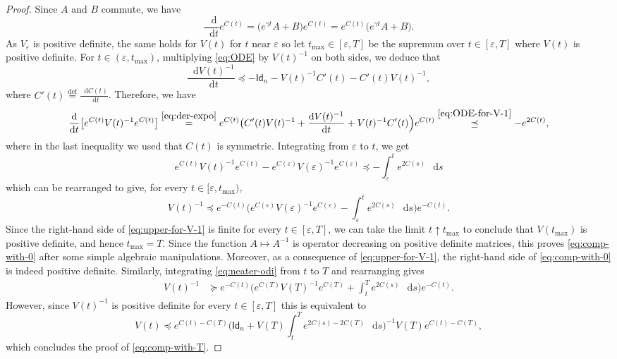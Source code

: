 \documentclass[a4paper,twoside,11pt,reqno]{amsart}
\newcommand{\eqdef}{\stackrel{\mathrm{def}}{=}}
\newcommand*\diff{\mathop{}\!\mathrm{d}}
\newcommand{\e}{\varepsilon}
\newcommand{\msf}{\mathsf}
\begin{document}
\begin{proof}
Since $A$ and $B$ commute,  we have
\begin{equation} \label{eq:der-expo}
\frac{\diff}{\diff t}e^{C(t)} = \big( e^{\gamma t}A+B\big)e^{C(t)} = e^{C(t)}\big( e^{\gamma t}A+B\big).
\end{equation}
As $V_\e$ is positive definite, the same holds for $V(t)$ for $t$ near $\e$ so let $t_{\max}\in [\e,T]$ be the supremum over $t\in [\e,T]$ where $V(t)$ is positive definite. For $t\in (\e,t_{\max})$, multiplying \eqref{eq:ODE} by $V(t)^{-1}$ on both sides, we deduce that
\begin{equation} \label{eq:ODE-for-V-1}
\frac{\diff V(t)^{-1}}{\diff t} \preceq -\msf{Id}_n - V(t)^{-1} C'(t) - C'(t) V(t)^{-1},
\end{equation}
where $C'(t) \eqdef \frac{\diff C(t)}{\diff t}$. Therefore, we have
\begin{equation} \label{eq:neater-odi}
\frac{\diff }{\diff t} \big[ e^{C(t)} V(t)^{-1} e^{C(t)} \big] \stackrel{\eqref{eq:der-expo}}{=} e^{C(t)} \big( C'(t) V(t)^{-1} + \frac{\diff V(t)^{-1}}{\diff t} + V(t)^{-1} C'(t) \Big) e^{C(t)} \stackrel{\eqref{eq:ODE-for-V-1}}{\preceq} -e^{2C(t)},
\end{equation}
where in the last inequality we used that $C(t)$ is symmetric.  Integrating from $\e$ to $t$, we get
\begin{equation}
e^{C(t)}V(t)^{-1}e^{C(t)} - e^{C(\e)}V(\e)^{-1}e^{C(\e)} \preceq - \int_\e^t e^{2C(s)}\,\diff s
\end{equation}
which can be rearranged to give, for every $t\in [\e,t_{\max})$,
\begin{equation} \label{eq:upper-for-V-1}
V(t)^{-1} \preceq e^{-C(t)} \Big( e^{C(\e)} V(\e)^{-1} e^{C(\e)} - \int_\e^t e^{2C(s)}\,\diff s\Big) e^{-C(t)}.
\end{equation}
Since the right-hand side of \eqref{eq:upper-for-V-1} is finite for every $t\in [\e,T]$, we can take the limit $t\uparrow t_{\max}$ to conclude that $V(t_{\max})$ is positive definite, and hence $t_{\max}=T$. Since the function $A \mapsto A^{-1}$ is operator decreasing on positive definite matrices, this proves \eqref{eq:comp-with-0} after some simple algebraic manipulations.  Moreover, as a consequence of \eqref{eq:upper-for-V-1},  the right-hand side of \eqref{eq:comp-with-0} is indeed positive definite. Similarly,   integrating \eqref{eq:neater-odi} from $t$ to $T$ and rearranging gives
\begin{equation} \label{eq:gives-pd}
\begin{split}
V(t)^{-1} & \succeq e^{-C(t)} \Big( e^{C(T)} V(T)^{-1} e^{C(T)} + \int_t^{T} e^{2C(s)} \,\diff s\Big) e^{-C(t)}.
\end{split}
\end{equation}
However, since $V(t)^{-1}$ is positive definite for every $t\in [\e,T]$ this is equivalent to
\begin{equation}
V(t) \preceq e^{C(t)-C(T)} \Big( \msf{Id}_n + V(T) \int_t^{T} e^{2C(s)-2C(T)}\,\diff s \Big)^{-1} V(T) e^{C(t)-C(T)},
\end{equation} 
which concludes the proof of \eqref{eq:comp-with-T}.
\end{proof}
 
\end{document}
